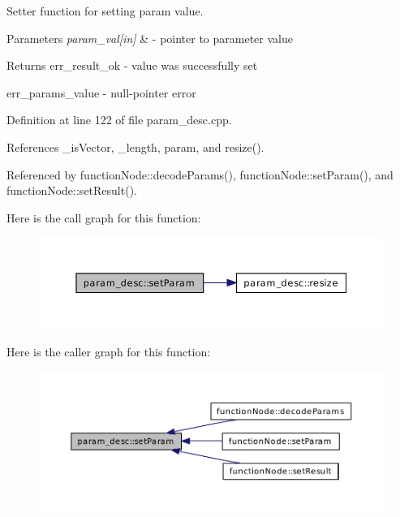 Setter function for setting param value. 


\begin{DoxyParams}{Parameters}
{\em param\_\-val\mbox{[}in\mbox{]}} & -\/ pointer to parameter value \\
\hline
\end{DoxyParams}
\begin{DoxyReturn}{Returns}
err\_\-result\_\-ok -\/ value was successfully set 

err\_\-params\_\-value -\/ null-\/pointer error 
\end{DoxyReturn}


Definition at line 122 of file param\_\-desc.cpp.



References \_\-isVector, \_\-length, param, and resize().



Referenced by functionNode::decodeParams(), functionNode::setParam(), and functionNode::setResult().



Here is the call graph for this function:\nopagebreak
\begin{figure}[H]
\begin{center}
\leavevmode
\includegraphics[width=376pt]{d9/d42/classparam__desc_a5b46389be506db92ac175bd71255fa7f_cgraph}
\end{center}
\end{figure}




Here is the caller graph for this function:\nopagebreak
\begin{figure}[H]
\begin{center}
\leavevmode
\includegraphics[width=400pt]{d9/d42/classparam__desc_a5b46389be506db92ac175bd71255fa7f_icgraph}
\end{center}
\end{figure}


